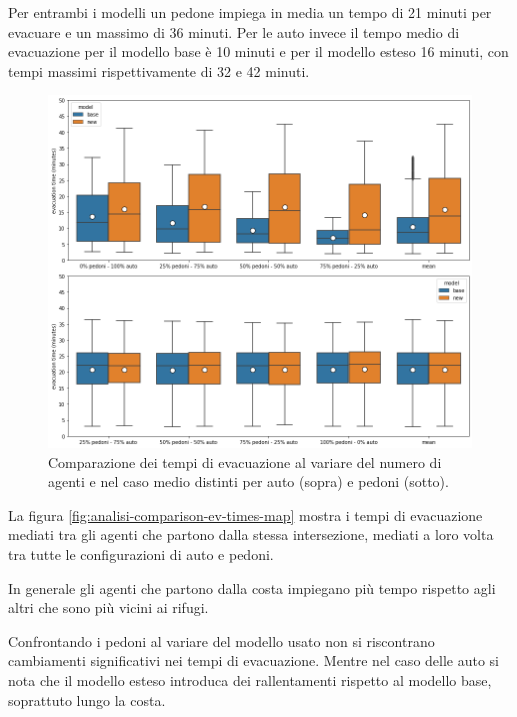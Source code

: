 Per entrambi i modelli un pedone impiega in media un tempo di 21 minuti per evacuare e un massimo di 36 minuti.
Per le auto invece il tempo medio di evacuazione per il modello base è 10 minuti e per il modello esteso 16 minuti, 
con tempi massimi rispettivamente di 32 e 42 minuti.

\begin{figure}[ht]
    \centering
    \includegraphics[width=\textwidth]{images/analisi/comparison-evtimes2.png}
    \caption{
        Comparazione dei tempi di evacuazione al variare del numero di agenti e nel caso medio distinti per auto (sopra) e pedoni (sotto).
    }
    \label{fig:analisi-comparison-evtimes2}
\end{figure}

\pagebreak

La figura \ref{fig:analisi-comparison-ev-times-map} mostra i tempi di evacuazione mediati tra gli agenti che partono dalla stessa intersezione,
mediati a loro volta tra tutte le configurazioni di auto e pedoni.

In generale gli agenti che partono dalla costa impiegano più tempo rispetto agli altri che sono più vicini ai rifugi.

Confrontando i pedoni al variare del modello usato non si riscontrano cambiamenti significativi nei tempi di evacuazione.
Mentre nel caso delle auto si nota che il modello esteso introduca dei rallentamenti rispetto al modello base, soprattuto lungo la costa.

